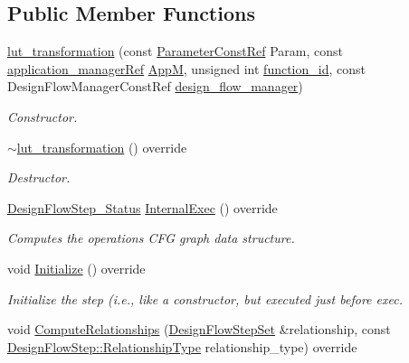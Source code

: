 \subsection*{Public Member Functions}
\begin{DoxyCompactItemize}
\item 
\hyperlink{classlut__transformation_a6bf32144886b5777cc0f22a897bb3cfe}{lut\+\_\+transformation} (const \hyperlink{Parameter_8hpp_a37841774a6fcb479b597fdf8955eb4ea}{Parameter\+Const\+Ref} Param, const \hyperlink{application__manager_8hpp_a04ccad4e5ee401e8934306672082c180}{application\+\_\+manager\+Ref} \hyperlink{classFrontendFlowStep_a0ac0d8db2a378416583f51c4faa59d15}{AppM}, unsigned int \hyperlink{classFunctionFrontendFlowStep_a58ef2383ad1a212a8d3f396625a4b616}{function\+\_\+id}, const Design\+Flow\+Manager\+Const\+Ref \hyperlink{classDesignFlowStep_ab770677ddf087613add30024e16a5554}{design\+\_\+flow\+\_\+manager})
\begin{DoxyCompactList}\small\item\em Constructor. \end{DoxyCompactList}\item 
\hyperlink{classlut__transformation_a7b8a0553ba4c11f646549cfa9b456ae6}{$\sim$lut\+\_\+transformation} () override
\begin{DoxyCompactList}\small\item\em Destructor. \end{DoxyCompactList}\item 
\hyperlink{design__flow__step_8hpp_afb1f0d73069c26076b8d31dbc8ebecdf}{Design\+Flow\+Step\+\_\+\+Status} \hyperlink{classlut__transformation_a63de4e9273d6ab51e6a8730192ff759c}{Internal\+Exec} () override
\begin{DoxyCompactList}\small\item\em Computes the operations C\+FG graph data structure. \end{DoxyCompactList}\item 
void \hyperlink{classlut__transformation_ae48068e30dd6842435f9e26c23b11485}{Initialize} () override
\begin{DoxyCompactList}\small\item\em Initialize the step (i.\+e., like a constructor, but executed just before exec. \end{DoxyCompactList}\item 
void \hyperlink{classlut__transformation_a91631c01821c79e4c92f0be5d92af0a4}{Compute\+Relationships} (\hyperlink{classDesignFlowStepSet}{Design\+Flow\+Step\+Set} \&relationship, const \hyperlink{classDesignFlowStep_a723a3baf19ff2ceb77bc13e099d0b1b7}{Design\+Flow\+Step\+::\+Relationship\+Type} relationship\+\_\+type) override

\end{DoxyCompactItemize}
